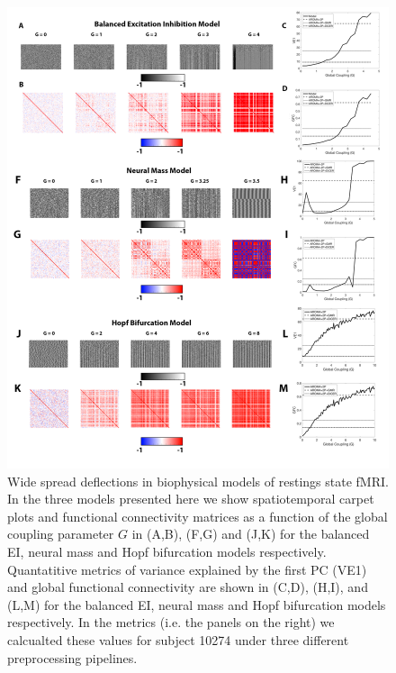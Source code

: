 \documentclass[oneside]{zHenriquesLab-StyleBioRxiv}
\begin{document}
\begin{figure}[ht!]
\includegraphics[width=1\textwidth]{figs/Models_all.png}
\caption{Wide spread deflections in biophysical models of restings state fMRI. In the three models presented here we show spatiotemporal carpet plots and functional connectivity matrices as a function of the global coupling parameter $G$ in (A,B), (F,G) and (J,K) for the balanced EI, neural mass and Hopf bifurcation models respectively. Quantatitive metrics of variance explained by the first PC (VE1) and global functional connectivity are shown in (C,D), (H,I), and (L,M) for the balanced EI, neural mass and Hopf bifurcation models respectively. In the metrics (i.e. the panels on the right) we calcualted these values for subject 10274 under three different preprocessing pipelines.}\label{fig:BalancedEI_G}
\end{figure}
\end{document}
